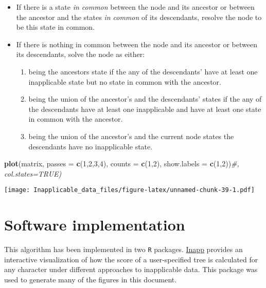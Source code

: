 \documentclass[]{book}
\newenvironment{Shaded}{\begin{snugshade}}{\end{snugshade}}
\newcommand{\KeywordTok}[1]{\textcolor[rgb]{0.13,0.29,0.53}{\textbf{#1}}}
\newcommand{\DataTypeTok}[1]{\textcolor[rgb]{0.13,0.29,0.53}{#1}}
\newcommand{\DecValTok}[1]{\textcolor[rgb]{0.00,0.00,0.81}{#1}}
\newcommand{\CommentTok}[1]{\textcolor[rgb]{0.56,0.35,0.01}{\textit{#1}}}
\newcommand{\NormalTok}[1]{#1}
\providecommand{\tightlist}{%
  \setlength{\itemsep}{0pt}\setlength{\parskip}{0pt}}
\theoremstyle{definition}
\theoremstyle{definition}
\theoremstyle{definition}
\theoremstyle{remark}
\begin{document}
\begin{itemize}
\tightlist
\item
  If there is a state \emph{in common} between the node and its ancestor
  or between the ancestor and the states \emph{in common} of its
  descendants, resolve the node to be this state in common.
\item
  If there is nothing in common between the node and its ancestor or
  between its descendants, solve the node as either:

  \begin{enumerate}
  \def\labelenumi{\arabic{enumi}.}
  \tightlist
  \item
    being the ancestors state if the any of the descendants' have at
    least one inapplicable state but no state in common with the
    ancestor.
  \item
    being the union of the ancestor's and the descendants' states if the
    any of the descendants have at least one inapplicable and have at
    least one state in common with the ancestor.
  \item
    being the union of the ancestor's and the current node states the
    descendants have no inapplicable state.
  \end{enumerate}
\end{itemize}

\begin{Shaded}
\begin{Highlighting}[]
\KeywordTok{plot}\NormalTok{(matrix, }\DataTypeTok{passes =} \KeywordTok{c}\NormalTok{(}\DecValTok{1}\NormalTok{,}\DecValTok{2}\NormalTok{,}\DecValTok{3}\NormalTok{,}\DecValTok{4}\NormalTok{), }\DataTypeTok{counts =} \KeywordTok{c}\NormalTok{(}\DecValTok{1}\NormalTok{,}\DecValTok{2}\NormalTok{), }\DataTypeTok{show.labels =} \KeywordTok{c}\NormalTok{(}\DecValTok{1}\NormalTok{,}\DecValTok{2}\NormalTok{))}\CommentTok{#, col.states=TRUE)}
\end{Highlighting}
\end{Shaded}

\texttt{[image: Inapplicable\_data\_files/figure-latex/unnamed-chunk-39-1.pdf]}

\hypertarget{software}{\section{Software
implementation}\label{software}}

This algorithm has been implemented in two \texttt{R} packages.
\href{https://github.com/TGuillerme/Inapp}{Inapp} provides an
interactive visualization of how the score of a user-specified tree is
calculated for any character under different approaches to inapplicable
data. This package was used to generate many of the figures in this
document.
\end{document}
